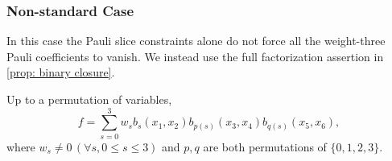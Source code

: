 \subsubsection{Non-standard Case}\label{subsubsec: Non-standard Klein}
In this case the Pauli slice constraints alone do not force all the
weight-three Pauli coefficients to vanish.  We instead use the full
factorization assertion in \cref{prop: binary closure}.

\begin{lemma}\label{lm: common matching}
    Up to a permutation of variables,
    \begin{equation}\label{eq: common matching}           
        f=\sum_{s=0}^3w_sb_s(x_1,x_2)b_{p(s)}(x_3,x_4)b_{q(s)}(x_5,x_6),
    \end{equation}
    where $w_s\neq 0\,(\forall s, 0\le s\le 3)$ and $p,q$ are both permutations of $\{0,1,2,3\}.$
\end{lemma}
